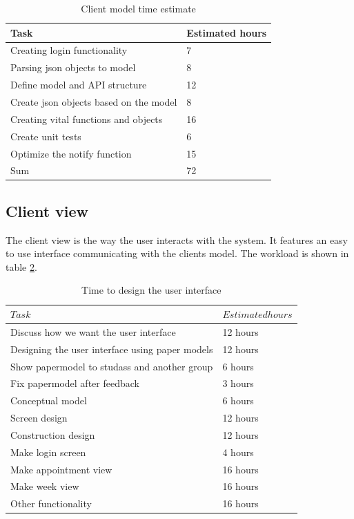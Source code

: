 \documentclass[a4paper, english, 12pt]{article}
\begin{document}
 \begin{table}[h!]
    \begin{center}
    \caption{Client model time estimate} 
    \label{clientmodel}
    \vspace{0,5cm}
    \begin{tabular}{ll} \\ 
        \hline
        Task & Estimated hours\\
        \hline 
    Creating login functionality & 7 \\
    Parsing json objects to model & 8 \\
    Define model and API structure  & 12\\
    Create json objects based on the model & 8 \\
    Creating vital functions and objects & 16 \\
    Create unit tests & 6 \\
    Optimize the notify function & 15 \\    
        \hline
    Sum & 72\\
    \hline
    \end{tabular}
    \end{center}
\end{table}



\subsection{Client view}
The client view is the way the user interacts with the system. It features an easy to use interface communicating with the clients model. The workload is shown in table \ref{UI}.

\begin{table}[h!]
    \begin{center}
    \caption{Time to design the user interface} 
    \label{UI}
    \vspace{0,5cm}
    \begin{tabular}{ll} \\ 
        \hline
        $Task$ & $Estimated hours$\\
        \hline 
    Discuss how we want the user interface & 12 hours\\
    Designing the user interface using paper models & 12 hours\\    
    Show papermodel to studass and another group & 6 hours\\
    Fix papermodel after feedback & 3 hours\\
    Conceptual model & 6 hours\\
    Screen design & 12 hours\\
    Construction design & 12 hours\\
    Make login screen & 4 hours\\
    Make appointment view & 16 hours\\
    Make week view & 16 hours\\
    Other functionality & 16 hours\\
        \hline
    \end{tabular}
    \end{center}
\end{table}
\end{document}
